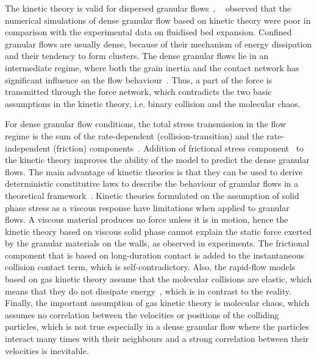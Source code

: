 The kinetic theory is valid for dispersed granular flows~\citep{Ng2008}, 
~\citet{VanWachem2001} observed that the numerical simulations of dense 
granular flow based on kinetic theory were poor in comparison with the 
experimental data on fluidised bed expansion. Confined granular flows are 
usually dense, because of their mechanism of energy dissipation and their 
tendency to form clusters. The dense granular flows lie in an intermediate 
regime, where both the grain inertia and the contact network has significant 
influence on the flow behaviour~\citep{Pouliquen2002}. Thus, a part of the 
force is transmitted through the force network, which contradicts the two basic 
assumptions in the kinetic theory, i.e. binary collision and the molecular 
chaos. 

For dense granular flow conditions, the total stress transmission in the flow 
regime is the sum of the rate-dependent (collision-transition) and the 
rate-independent (friction) components~\citep{Ng2008}. Addition of frictional 
stress component~\citep{Schaeffer1987} to the kinetic theory improves the 
ability of the model to predict the dense granular flows. The main advantage of 
kinetic theories is that they can be used to derive deterministic constitutive 
laws to describe the behaviour of granular flows in a theoretical 
framework~\citep{Jenkins1983}. Kinetic theories formulated on the assumption of 
solid phase stress as a viscous response have limitations when applied to 
granular flows. A viscous material produces no force unless it is in motion, 
hence the kinetic theory based on viscous solid phase cannot explain the static 
force exerted by the granular materials on the walls, as observed in 
experiments. The frictional component that is based on long-duration contact is 
added to the instantaneous collision contact term, which is self-contradictory. 
Also, the rapid-flow models based on gas 
kinetic theory assume that the molecular collisions are elastic, which means 
that they do not dissipate energy~\citep{Campbell2006}, which is in contrast to 
the reality. Finally, the important assumption of gas kinetic theory is 
molecular chaos, which assumes no correlation between the velocities or 
positions of the colliding particles, which is not true especially in a dense 
granular flow where the particles interact many times with their neighbours and 
a strong correlation between their velocities is inevitable.


